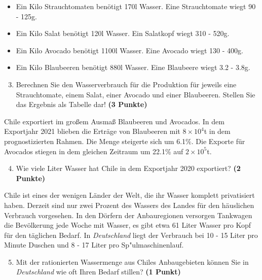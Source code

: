 \documentclass[a4paper, 9pt]{scrartcl}\usepackage[]{graphicx}\usepackage[]{xcolor}
\begin{document}
\begin{itemize}[noitemsep]
\item Ein Kilo Strauchtomaten benötigt 170l Wasser. Eine Strauchtomate wiegt 90 - 125g.
\item Ein Kilo Salat benötigt 120l Wasser. Ein Salatkopf wiegt 310 - 520g.
\item Ein Kilo Avocado benötigt 1100l Wasser. Eine Avocado wiegt 130 - 400g.
\item Ein Kilo Blaubeeren benötigt 880l Wasser. Eine Blaubeere wiegt 3.2 - 3.8g.
\end{itemize}

\begin{enumerate}
  \setcounter{enumi}{2}
\item Berechnen Sie den Wasserverbrauch für die Produktion für jeweils eine Strauchtomate, einem Salat, einer Avocado und einer Blaubeeren. Stellen Sie das Ergebnis als Tabelle dar! \textbf{(3 Punkte)}
\end{enumerate}

Chile exportiert im großem Ausmaß Blaubeeren und Avocados. In dem Exportjahr 2021 blieben die Erträge von Blaubeeren mit \ensuremath{8\times 10^{4}}t in dem prognostizierten Rahmen. Die Menge steigerte sich um 6.1\%. Die Exporte für Avocados stiegen in dem gleichen Zeitraum um 22.1\% auf \ensuremath{2\times 10^{5}}t.

\begin{enumerate}
  \setcounter{enumi}{3}
\item Wie viele Liter Wasser hat Chile in dem Exportjahr 2020 exportiert? \textbf{(2 Punkte)}
\end{enumerate}

Chile ist eines der wenigen Länder der Welt, die ihr Wasser komplett privatisiert haben. Derzeit sind nur zwei Prozent des Wassers des Landes für den häuslichen Verbrauch vorgesehen. In den Dörfern der Anbauregionen versorgen Tankwagen die Bevölkerung jede Woche mit Wasser, es gibt etwa 61 Liter Wasser pro Kopf für den täglichen Bedarf. In \textit{Deutschland} liegt der Verbrauch bei 10 - 15 Liter pro Minute Duschen und 8 - 17 Liter pro Sp{"u}lmaschinenlauf.

\begin{enumerate}
  \setcounter{enumi}{4}
\item Mit der rationierten Wassermenge aus Chiles Anbaugebieten können Sie in \textit{Deutschland} wie oft Ihren Bedarf stillen? \textbf{(1 Punkt)}
\end{enumerate}
\end{document}

